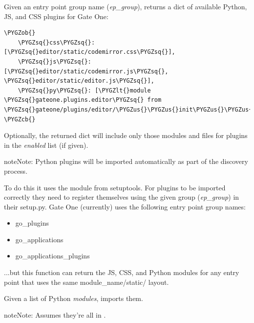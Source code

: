 \documentclass[letterpaper,10pt,openany]{sphinxmanual}
\def\PYGZus{\char`\_}
\def\PYGZob{\char`\{}
\def\PYGZcb{\char`\}}
\def\PYGZlt{\char`\<}
\def\PYGZgt{\char`\>}
\def\PYGZsq{\char`\'}
\begin{document}
\begin{fulllineitems}
\label{Developer/utils:gateone.core.utils.entry_point_files}
Given an entry point group name (\emph{ep\_group}), returns a dict of available
Python, JS, and CSS plugins for Gate One:

\begin{Verbatim}[commandchars=\\\{\}]
\PYGZob{}
    \PYGZsq{}css\PYGZsq{}: [\PYGZsq{}editor/static/codemirror.css\PYGZsq{}],
    \PYGZsq{}js\PYGZsq{}: [\PYGZsq{}editor/static/codemirror.js\PYGZsq{}, \PYGZsq{}editor/static/editor.js\PYGZsq{}],
    \PYGZsq{}py\PYGZsq{}: [\PYGZlt{}module \PYGZsq{}gateone.plugins.editor\PYGZsq{} from \PYGZsq{}gateone/plugins/editor/\PYGZus{}\PYGZus{}init\PYGZus{}\PYGZus{}.pyc\PYGZsq{}\PYGZgt{}]
\PYGZcb{}
\end{Verbatim}

Optionally, the returned dict will include only those modules and files for
plugins in the \emph{enabled} list (if given).

\begin{notice}{note}{Note:}
Python plugins will be imported automatically as part of the
discovery process.
\end{notice}

To do this it uses the  module from setuptools.  For plugins
to be imported correctly they need to register themselves using the given
 group (\emph{ep\_group}) in their setup.py.  Gate One (currently)
uses the following entry point group names:
\begin{itemize}
\item {} 
go\_plugins

\item {} 
go\_applications

\item {} 
go\_applications\_plugins

\end{itemize}

...but this function can return the JS, CSS, and Python modules for any
entry point that uses the same module\_name/static/ layout.

\end{fulllineitems}


\begin{fulllineitems}
\label{Developer/utils:gateone.core.utils.load_modules}
Given a list of Python \emph{modules}, imports them.

\begin{notice}{note}{Note:}
Assumes they're all in .
\end{notice}

\end{fulllineitems}
\end{document}
